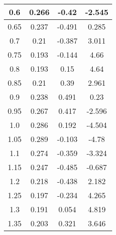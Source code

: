 \begin{multicols}{2}
\begin{longtable}{|c|c|c|c|}
    \hline
    0.6      & 0.266        & -0.42                                  & -2.545                                       \\
    \hline
    0.65     & 0.237        & -0.491                                 & 0.285                                        \\
    \hline
    0.7      & 0.21         & -0.387                                 & 3.011                                        \\
    \hline
    0.75     & 0.193        & -0.144                                 & 4.66                                         \\
    \hline
    0.8      & 0.193        & 0.15                                   & 4.64                                         \\
    \hline
    0.85     & 0.21         & 0.39                                   & 2.961                                        \\
    \hline
    0.9      & 0.238        & 0.491                                  & 0.23                                         \\
    \hline
    0.95     & 0.267        & 0.417                                  & -2.596                                       \\
    \hline
    1.0      & 0.286        & 0.192                                  & -4.504                                       \\
    \hline
    1.05     & 0.289        & -0.103                                 & -4.78                                        \\
    \hline
    1.1      & 0.274        & -0.359                                 & -3.324                                       \\
    \hline
    1.15     & 0.247        & -0.485                                 & -0.687                                       \\
    \hline
    1.2      & 0.218        & -0.438                                 & 2.182                                        \\
    \hline
    1.25     & 0.197        & -0.234                                 & 4.265                                        \\
    \hline
    1.3      & 0.191        & 0.054                                  & 4.819                                        \\
    \hline
    1.35     & 0.203        & 0.321                                  & 3.646                                        \\

\end{longtable}
\end{multicols}
